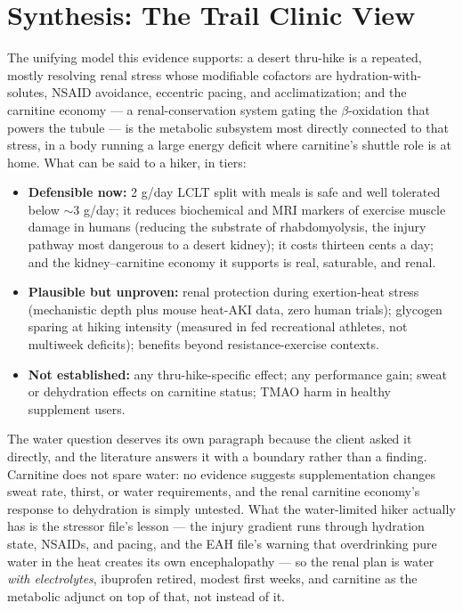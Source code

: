 \section{Synthesis: The Trail Clinic View}
\label{sec:synth}

The unifying model this evidence supports: a desert thru-hike is a repeated, mostly resolving renal stress whose modifiable cofactors are hydration-with-solutes, NSAID avoidance, eccentric pacing, and acclimatization; and the carnitine economy --- a renal-conservation system gating the $\beta$-oxidation that powers the tubule --- is the metabolic subsystem most directly connected to that stress, in a body running a large energy deficit where carnitine's shuttle role is at home. What can be said to a hiker, in tiers:

\begin{itemize}[leftmargin=1.4em]
\item \textbf{Defensible now:} 2 g/day LCLT split with meals is safe and well tolerated below $\sim$3 g/day; it reduces biochemical and MRI markers of exercise muscle damage in humans (reducing the substrate of rhabdomyolysis, the injury pathway most dangerous to a desert kidney); it costs thirteen cents a day; and the kidney--carnitine economy it supports is real, saturable, and renal.
\item \textbf{Plausible but unproven:} renal protection during exertion-heat stress (mechanistic depth plus mouse heat-AKI data, zero human trials); glycogen sparing at hiking intensity (measured in fed recreational athletes, not multiweek deficits); benefits beyond resistance-exercise contexts.
\item \textbf{Not established:} any thru-hike-specific effect; any performance gain; sweat or dehydration effects on carnitine status; TMAO harm in healthy supplement users.
\end{itemize}

The water question deserves its own paragraph because the client asked it directly, and the literature answers it with a boundary rather than a finding. Carnitine does not spare water: no evidence suggests supplementation changes sweat rate, thirst, or water requirements, and the renal carnitine economy's response to dehydration is simply untested. What the water-limited hiker actually has is the stressor file's lesson --- the injury gradient runs through hydration state, NSAIDs, and pacing, and the EAH file's warning that overdrinking pure water in the heat creates its own encephalopathy --- so the renal plan is water \emph{with electrolytes}, ibuprofen retired, modest first weeks, and carnitine as the metabolic adjunct on top of that, not instead of it.

